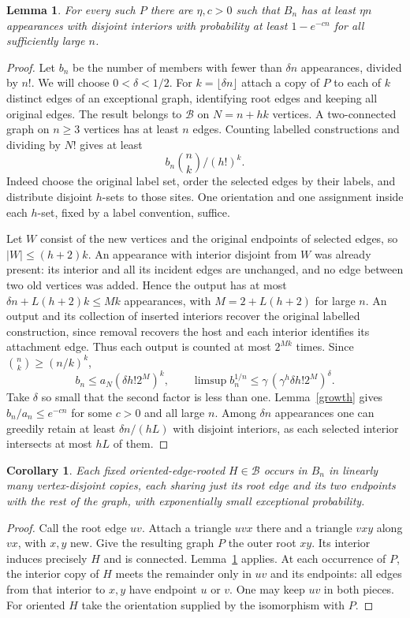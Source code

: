 \documentclass[11pt]{article}
\newtheorem{lemma}[theorem]{Lemma}
\newtheorem{corollary}[theorem]{Corollary}
\newcommand{\B}{\mathcal B}
\begin{document}
\begin{lemma}\label{insert}
For every such $P$ there are $\eta,c>0$ such that $B_n$ has at least $\eta n$ appearances with disjoint interiors with probability at least $1-e^{-cn}$ for all sufficiently large $n$.
\end{lemma}
\begin{proof}
Let $b_n$ be the number of members with fewer than $\delta n$ appearances, divided by $n!$. We will choose $0<\delta<1/2$. For $k=\lfloor\delta n\rfloor$ attach a copy of $P$ to each of $k$ distinct edges of an exceptional graph, identifying root edges and keeping all original edges. The result belongs to $\B$ on $N=n+hk$ vertices. A two-connected graph on $n\ge3$ vertices has at least $n$ edges. Counting labelled constructions and dividing by $N!$ gives at least
\[
 b_n \binom{n}{k}/(h!)^k.
\]
Indeed choose the original label set, order the selected edges by their labels, and distribute disjoint $h$-sets to those sites. One orientation and one assignment inside each $h$-set, fixed by a label convention, suffice.

Let $W$ consist of the new vertices and the original endpoints of selected edges, so $|W|\le(h+2)k$. An appearance with interior disjoint from $W$ was already present: its interior and all its incident edges are unchanged, and no edge between two old vertices was added. Hence the output has at most $\delta n+L(h+2)k\le Mk$ appearances, with $M=2+L(h+2)$ for large $n$. An output and its collection of inserted interiors recover the original labelled construction, since removal recovers the host and each interior identifies its attachment edge. Thus each output is counted at most $2^{Mk}$ times. Since $\binom{n}{k}\ge(n/k)^k$,
\[
 b_n\le a_N(\delta h!2^M)^k,\qquad
 \limsup b_n^{1/n}\le\gamma\,(\gamma^h\delta h!2^M)^\delta .
\]
Take $\delta$ so small that the second factor is less than one. Lemma~\ref{growth} gives $b_n/a_n\le e^{-cn}$ for some $c>0$ and all large $n$. Among $\delta n$ appearances one can greedily retain at least $\delta n/(hL)$ with disjoint interiors, as each selected interior intersects at most $hL$ of them.
\end{proof}

\begin{corollary}\label{package}
Each fixed oriented-edge-rooted $H\in\B$ occurs in $B_n$ in linearly many vertex-disjoint copies, each sharing just its root edge and its two endpoints with the rest of the graph, with exponentially small exceptional probability.
\end{corollary}
\begin{proof}
Call the root edge $uv$. Attach a triangle $uvx$ there and a triangle $vxy$ along $vx$, with $x,y$ new. Give the resulting graph $P$ the outer root $xy$. Its interior induces precisely $H$ and is connected. Lemma~\ref{insert} applies. At each occurrence of $P$, the interior copy of $H$ meets the remainder only in $uv$ and its endpoints: all edges from that interior to $x,y$ have endpoint $u$ or $v$. One may keep $uv$ in both pieces. For oriented $H$ take the orientation supplied by the isomorphism with $P$.
\end{proof}
\end{document}
